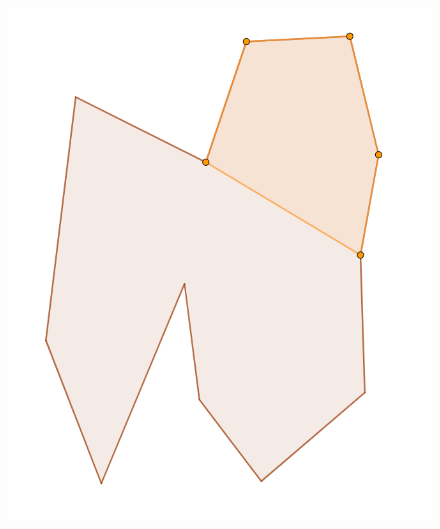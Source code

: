 \documentclass[12pt]{article}
\begin{document}
\begin{figure}[H]
  \caption{}
  \label{fig:intersectionPolygonSection4}
\endminipage\hfill
{}
  \includegraphics[width=\linewidth]{Images/intersection_yMonotoneSection5.png}
  \caption{}
  \label{fig:intersectionPolygonSection5}
\endminipage
\end{figure}
\end{document}
